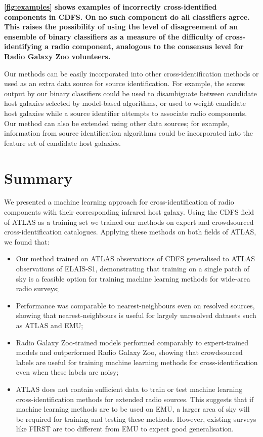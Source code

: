\documentclass[fleqn,usenatbib,usedcolumn]{mnras}
\newcommand{\edited}[1]{{\bf {#1}}}
\begin{document}
  \edited{\autoref{fig:examples} shows examples of incorrectly cross-identified
  components in CDFS. On no such component do all classifiers agree.
  This raises the possibility of using the level of disagreement of an
  ensemble of binary classifiers as a measure of the difficulty of cross-identifying a radio component,
  analogous to the consensus level for Radio Galaxy Zoo volunteers.}

  Our methods can be easily incorporated into other cross-identification
  methods or used as an extra data source for source identification. For
  example, the scores output by our binary classifiers could be used to
  disambiguate between candidate host
  galaxies selected by model-based algorithms, or used to weight candidate
  host galaxies while a source identifier attempts to associate radio
  components. Our method can also be extended using other data sources; for
  example, information from source identification algorithms could be
  incorporated into the feature set of candidate host galaxies.

\section{Summary}

  We presented a machine learning approach for cross-identification of radio
  components with their corresponding infrared host galaxy. Using the CDFS
  field of ATLAS as a training set we trained our
  methods on expert and crowdsourced cross-identification catalogues.
  Applying these methods on both fields of ATLAS, we found that:
  \begin{itemize}
    \item Our method trained on ATLAS observations of CDFS generalised to
    ATLAS observations of ELAIS-S1, demonstrating that training on a single
    patch of sky is a feasible option for training machine learning methods
    for wide-area radio surveys;
    \item Performance was comparable to nearest-neighbours even on resolved
    sources, showing that nearest-neighbours is useful for largely unresolved
    datasets such as ATLAS and EMU;
    \item Radio Galaxy Zoo-trained models performed comparably to
    expert-trained models and outperformed Radio Galaxy Zoo, showing that
    crowdsourced labels are useful for training machine learning methods for
    cross-identification even when these labels are noisy;
    \item ATLAS does not contain sufficient data to train or test machine
    learning cross-identification methods for extended radio sources. This
    suggests that if machine learning methods are to be used on EMU, a larger
    area of sky will be required for training and testing these methods.
    However, existing surveys like FIRST are too different from EMU to expect
    good generalisation.
  \end{itemize}
\end{document}
